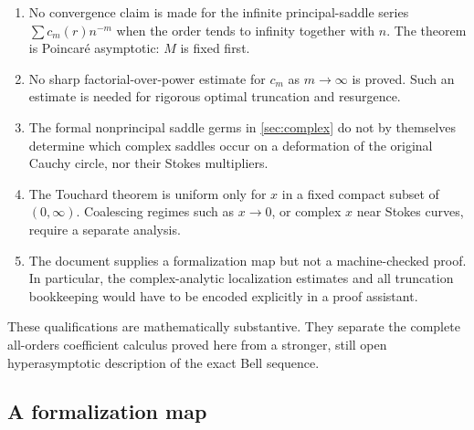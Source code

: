 \documentclass[11pt,a4paper]{article}
\theoremstyle{definition}
\theoremstyle{remark}
\begin{document}
\begin{auditbox}[title={Boundaries of the present result}]
\begin{enumerate}[label=(\alph*),leftmargin=2.1em,itemsep=3pt]
 \item No convergence claim is made for the infinite principal-saddle series
       \(\sum c_m(r)n^{-m}\) when the order tends to infinity together with
       \(n\).  The theorem is Poincar\'e asymptotic: \(M\) is fixed first.
 \item No sharp factorial-over-power estimate for \(c_m\) as
       \(m\to\infty\) is proved.  Such an estimate is needed for rigorous
       optimal truncation and resurgence.
 \item The formal nonprincipal saddle germs in \cref{sec:complex} do not by
       themselves determine which complex saddles occur on a deformation of
       the original Cauchy circle, nor their Stokes multipliers.
 \item The Touchard theorem is uniform only for \(x\) in a fixed compact
       subset of \((0,\infty)\).  Coalescing regimes such as \(x\to0\), or
       complex \(x\) near Stokes curves, require a separate analysis.
 \item The document supplies a formalization map but not a machine-checked
       proof.  In particular, the complex-analytic localization estimates and
       all truncation bookkeeping would have to be encoded explicitly in a
       proof assistant.
\end{enumerate}
\end{auditbox}

These qualifications are mathematically substantive.  They separate the
complete all-orders coefficient calculus proved here from a stronger, still
open hyperasymptotic description of the exact Bell sequence.

\subsection{A formalization map}
\end{document}
